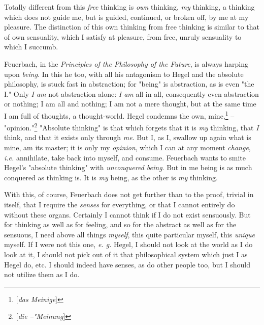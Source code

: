 \documentclass[a4paper]{book}
\begin{document}
Totally different from this \textit{free} thinking is \textit{own} thinking, 
\textit{my} thinking, a thinking which does not guide me, but is guided, 
continued, or broken off, by me at my pleasure. The distinction of this own 
thinking from free thinking is similar to that of own sensuality, which I 
satisfy at pleasure, from free, unruly sensuality to which I succumb.

Feuerbach, in the \textit{Principles of the Philosophy of the Future}, is 
always harping upon \textit{being}. In this he too, with all his antagonism to 
Hegel and the absolute philosophy, is stuck fast in abstraction; for 
"{}being"{} is abstraction, as is even "{}the I."{} Only \textit{I am} not 
abstraction alone: \textit{I am} all in all, consequently even abstraction or 
nothing; I am all and nothing; I am not a mere thought, but at the same time I 
am full of thoughts, a thought-world. Hegel condemns the own, 
mine,\footnote{[\textit{das Meinige}]} -- "{}opinion."{}\footnote{[\textit{die 
--"{}Meinung}]} "{}Absolute thinking"{} is that which forgets that it is 
\textit{my} thinking, that \textit{I} think, and that it exists only through 
\textit{me}. But I, as I, swallow up again what is mine, am its master; it is 
only my \textit{opinion}, which I can at any moment \textit{change}, 
\textit{i.e.} annihilate, take back into myself, and consume. Feuerbach wants 
to smite Hegel's "{}absolute thinking"{} with \textit{unconquered being}. But 
in me being is as much conquered as thinking is. It is \textit{my} being, as 
the other is \textit{my} thinking.

With this, of course, Feuerbach does not get further than to the proof, 
trivial in itself, that I require the \textit{senses} for everything, or that 
I cannot entirely do without these organs. Certainly I cannot think if I do 
not exist sensuously. But for thinking as well as for feeling, and so for the 
abstract as well as for the sensuous, I need above all things \textit{myself}, 
this quite particular myself, this \textit{unique} myself. If I were not this 
one, \textit{e. g.} Hegel, I should not look at the world as I do look at it, 
I should not pick out of it that philosophical system which just I as Hegel 
do, etc. I should indeed have senses, as do other people too, but I should not 
utilize them as I do.
\end{document}

